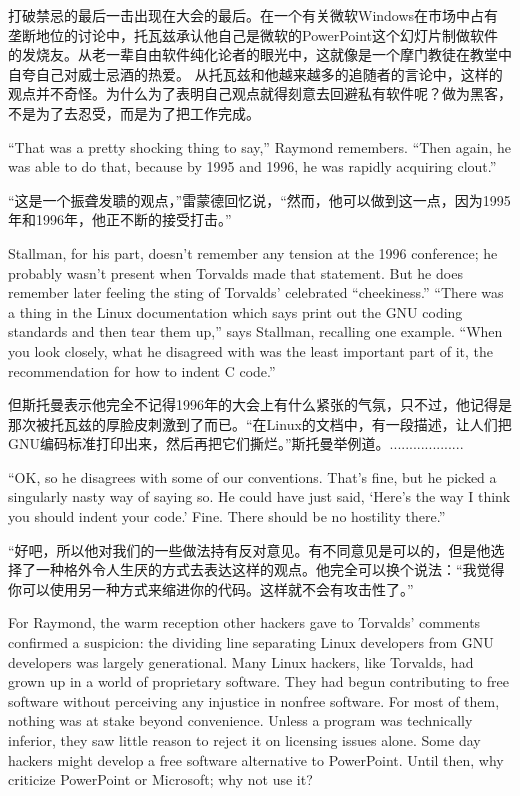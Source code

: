 \ifdefined\chs
打破禁忌的最后一击出现在大会的最后。在一个有关微软Windows在市场中占有垄断地位的讨论中，托瓦兹承认他自己是微软的PowerPoint这个幻灯片制做软件的发烧友。从老一辈自由软件纯化论者的眼光中，这就像是一个摩门教徒在教堂中自夸自己对威士忌酒的热爱。 从托瓦兹和他越来越多的追随者的言论中，这样的观点并不奇怪。为什么为了表明自己观点就得刻意去回避私有软件呢？做为黑客，不是为了去忍受，而是为了把工作完成。
\fi

\ifdefined\eng
``That was a pretty shocking thing to say,'' Raymond remembers. ``Then again, he was able to do that, because by 1995 and 1996, he was rapidly acquiring clout.''
\fi

\ifdefined\chs
“这是一个振聋发聩的观点，”雷蒙德回忆说，“然而，他可以做到这一点，因为1995年和1996年，他正不断的接受打击。”
\fi

\ifdefined\eng
Stallman, for his part, doesn't remember any tension at the 1996 conference; he probably wasn't present when Torvalds made that statement.  But he does remember later feeling the sting of Torvalds' celebrated ``cheekiness.'' ``There was a thing in the Linux documentation which says print out the GNU coding standards and then tear them up,'' says Stallman, recalling one example. ``When you look closely, what he disagreed with was the least important part of it, the recommendation for how to indent C code.''
\fi

\ifdefined\chs
但斯托曼表示他完全不记得1996年的大会上有什么紧张的气氛，只不过，他记得是那次被托瓦兹的厚脸皮刺激到了而已。“在Linux的文档中，有一段描述，让人们把GNU编码标准打印出来，然后再把它们撕烂。”斯托曼举例道。...................
\fi

\ifdefined\eng
``OK, so he disagrees with some of our conventions. That's fine, but he picked a singularly nasty way of saying so. He could have just said, `Here's the way I think you should indent your code.' Fine. There should be no hostility there.''
\fi

\ifdefined\chs
“好吧，所以他对我们的一些做法持有反对意见。有不同意见是可以的，但是他选择了一种格外令人生厌的方式去表达这样的观点。他完全可以换个说法：“我觉得你可以使用另一种方式来缩进你的代码。这样就不会有攻击性了。”
\fi

\ifdefined\eng
For Raymond, the warm reception other hackers gave to Torvalds' comments confirmed a suspicion: the dividing line separating Linux developers from GNU developers was largely generational. Many Linux hackers, like Torvalds, had grown up in a world of proprietary software. They had begun contributing to free software without perceiving any injustice in nonfree software.  For most of them, nothing was at stake beyond convenience.  Unless a program was technically inferior, they saw little reason to reject it on licensing issues alone. Some day hackers might develop a free software alternative to PowerPoint. Until then, why criticize PowerPoint or Microsoft; why not use it?
\fi

